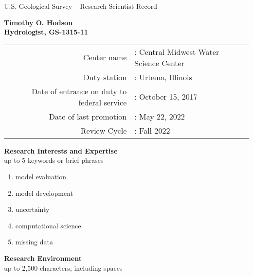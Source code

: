 \documentclass[12pt]{article}
\begin{document}




\centering \LARGE U.S. Geological Survey – Research Scientist Record \\
\vspace{10pt}
\normalsize

\centering \textbf{Timothy O. Hodson} \\

\centering \textbf{Hydrologist, GS-1315-11} \\

\vspace{5pt}

\begin{tabular}{@{}r@{}l}

\centering Center name &:	Central Midwest Water Science Center \\

\centering Duty station &:	Urbana, Illinois \\

\centering Date of entrance on duty to federal service &:	October 15, 2017\\

\centering Date of last promotion &:	May 22, 2022 \\

\centering Review Cycle &:	Fall 2022\\

\end{tabular}

\vspace{10pt}
\centering \textbf{Research Interests and Expertise} \\
\centering up to 5 keywords or brief phrases \\

\begin{enumerate}
	\item model evaluation
	\item model development
	\item uncertainty
	\item computational science
	\item missing data
\end{enumerate}


\vspace{10pt}
\centering \textbf{Research Environment} \\
\centering up to 2,500 characters, including spaces \\
\raggedright
\end{document}
